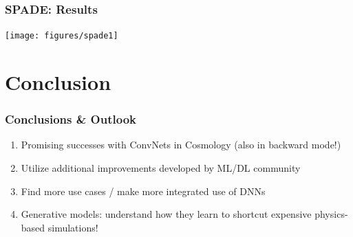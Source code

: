 \documentclass[compress]{beamer}
\newcommand{\is}[1]{\setlength{\itemsep}{#1}}
\begin{document}
\begin{frame} \frametitle{SPADE: Results}
\begin{center}
\texttt{[image: figures/spade1]}
\end{center}
\end{frame}

\section{Conclusion}
\frame{\sectionpage}

\begin{frame} \frametitle{Conclusions \& Outlook}
\begin{enumerate}\is{4mm}
\item Promising successes with ConvNets in Cosmology (also in backward mode!)
\item Utilize additional improvements developed by ML/DL community 
\item Find more use cases / make more integrated use of DNNs
\item Generative models: understand how they learn to shortcut expensive physics-based simulations!
\end{enumerate}
\end{frame}



\end{document}
